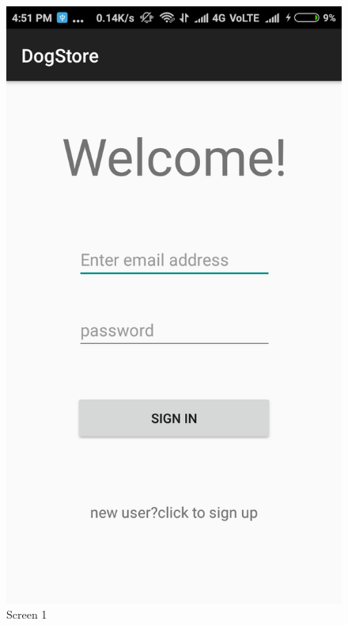 \begin{figure}[ht]
\centering
\includegraphics[scale=0.30]{images/1.png}
\caption{Screen 1}
\end{figure}

\newpage

